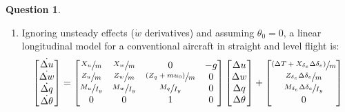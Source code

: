 \documentclass{article}
\theoremstyle{definition}
\newtheorem{question}{Question}
\begin{document}
\begin{question}
\begin{enumerate}[label=\alph*)]
    \item Ignoring unsteady effects ($\dot{w}$ derivatives) and assuming $\theta_0=0$, a linear longitudinal model for a conventional aircraft in straight and level flight is:
        \begin{equation}
            \begin{bmatrix} \dot{\Delta u} \\ \dot{\Delta w} \\ \dot{\Delta q} \\ \dot{\Delta \theta} \\ \end{bmatrix}
            = \begin{bmatrix}
                \sfrac{X_u}{m} & \sfrac{X_w}{m} & 0 & -g \\
                \sfrac{Z_u}{m} & \sfrac{Z_w}{m} & \sfrac{(Z_q + m u_0)}{m} & 0 \\
                \sfrac{M_u}{I_y} & \sfrac{M_w}{I_y} & \sfrac{M_q}{I_y} & 0 \\
                0 & 0 & 1 & 0 \\
            \end{bmatrix}
            \begin{bmatrix} \Delta u \\ \Delta w \\ \Delta q \\ \Delta \theta \end{bmatrix}
            + \begin{bmatrix}
                \sfrac{(\Delta T + X_{\delta_e} \Delta \delta_e)}{m} \\
                \sfrac{Z_{\delta_e} \Delta \delta_e}{m} \\
                \sfrac{M_{\delta_e} \Delta \delta_e}{I_y} \\
                0
            \end{bmatrix}
        \end{equation}


\end{enumerate}
\end{question}
\end{document}
